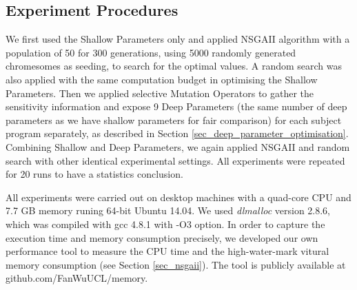 \subsection{Experiment Procedures}

We first used the Shallow Parameters only and applied NSGAII algorithm with a population of 50 for 300 generations, using 5000 randomly generated chromesomes as seeding, to search for the optimal values. A random search was also applied with the same computation budget in optimising the Shallow Parameters. Then we applied selective Mutation Operators to gather the sensitivity information and expose 9 Deep Parameters (the same number of deep parameters as we have shallow parameters for fair comparison) for each subject program separately, as described in Section \ref{sec_deep_parameter_optimisation}. Combining Shallow and Deep Parameters, we again applied NSGAII and random search with other identical experimental settings. All experiments were repeated for 20 runs to have a statistics conclusion.

All experiments were carried out on desktop machines with a quad-core CPU and 7.7 GB memory runing 64-bit Ubuntu 14.04. We used \emph{dlmalloc} version 2.8.6, which was compiled with gcc 4.8.1 with -O3 option. In order to capture the execution time and memory consumption precisely, we developed our own performance tool to measure the CPU time and the high-water-mark vitural memory consumption (see Section \ref{sec_nsgaii}). The tool is publicly available at github.com/FanWuUCL/memory.


